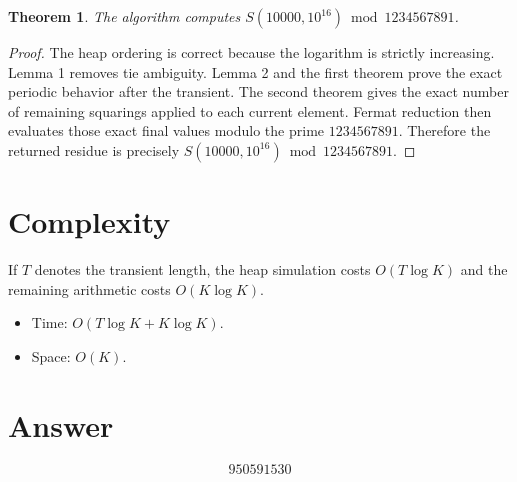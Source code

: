 \documentclass[11pt]{article}
\newtheorem{theorem}{Theorem}
\begin{document}
\begin{theorem}
The algorithm computes $S(10000,10^{16}) \bmod 1234567891$.
\end{theorem}

\begin{proof}
The heap ordering is correct because the logarithm is strictly increasing. Lemma 1 removes tie ambiguity. Lemma 2 and the first theorem prove the exact periodic behavior after the transient. The second theorem gives the exact number of remaining squarings applied to each current element. Fermat reduction then evaluates those exact final values modulo the prime $1234567891$. Therefore the returned residue is precisely $S(10000,10^{16}) \bmod 1234567891$.
\end{proof}

\section{Complexity}

If $T$ denotes the transient length, the heap simulation costs $O(T\log K)$ and the remaining arithmetic costs $O(K\log K)$.

\begin{itemize}
\item Time: $O(T\log K + K\log K)$.
\item Space: $O(K)$.
\end{itemize}

\section{Answer}

\[
\boxed{950591530}
\]
\end{document}
